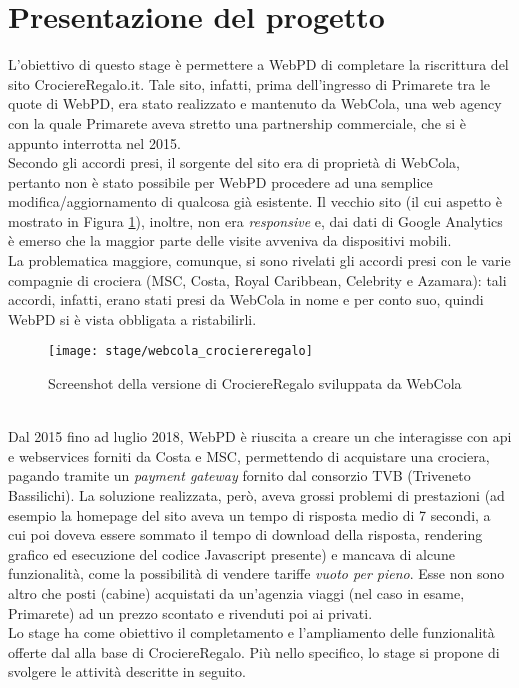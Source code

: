 \section{Presentazione del progetto}
L'obiettivo di questo stage è permettere a WebPD di completare la riscrittura del sito CrociereRegalo.it. Tale sito, infatti, prima dell'ingresso di Primarete tra le quote di WebPD, era stato realizzato e mantenuto da WebCola, una web agency con la quale Primarete aveva stretto una partnership commerciale, che si è appunto interrotta nel 2015.\\
Secondo gli accordi presi, il sorgente del sito era di proprietà di WebCola, pertanto non è stato possibile per WebPD procedere ad una semplice modifica/aggiornamento di qualcosa già esistente. Il vecchio sito (il cui aspetto è mostrato in Figura \ref{figura:vecchio-sito}), inoltre, non era \textit{responsive} e, dai dati di Google Analytics è emerso che la maggior parte delle visite avveniva da dispositivi mobili. \\
La problematica maggiore, comunque, si sono rivelati gli accordi presi con le varie compagnie di crociera (MSC, Costa, Royal Caribbean, Celebrity e Azamara): tali accordi, infatti, erano stati presi da WebCola in nome e per conto suo, quindi WebPD si è vista obbligata a ristabilirli.
\begin{figure}[!h] 
	\centering 
	\texttt{[image: stage/webcola\_crociereregalo]} 
	\caption{Screenshot della versione di CrociereRegalo sviluppata da WebCola}
	\label{figura:vecchio-sito}
\end{figure}\\
Dal 2015 fino ad luglio 2018, WebPD è riuscita a creare un \bookingEngine\hphantom{i}che interagisse con \Gls{api} e \glspl{webservice} forniti da Costa e MSC, permettendo di acquistare una crociera, pagando tramite un \textit{payment gateway} fornito dal consorzio TVB (Triveneto Bassilichi). La soluzione realizzata, però, aveva grossi problemi di prestazioni (ad esempio la homepage del sito aveva un tempo di risposta medio di 7 secondi, a cui poi doveva essere sommato il tempo di download della risposta, rendering grafico ed esecuzione del codice Javascript presente) e mancava di alcune funzionalità, come la possibilità di vendere tariffe \textit{vuoto per pieno}. Esse non sono altro che posti (cabine) acquistati da un'agenzia viaggi (nel caso in esame, Primarete) ad un prezzo scontato e rivenduti poi ai privati.
\\
Lo stage ha come obiettivo il completamento e l'ampliamento delle funzionalità offerte dal \bookingEngine\hphantom{i}alla base di CrociereRegalo. Più nello specifico, lo stage si propone di svolgere le attività descritte in seguito.

